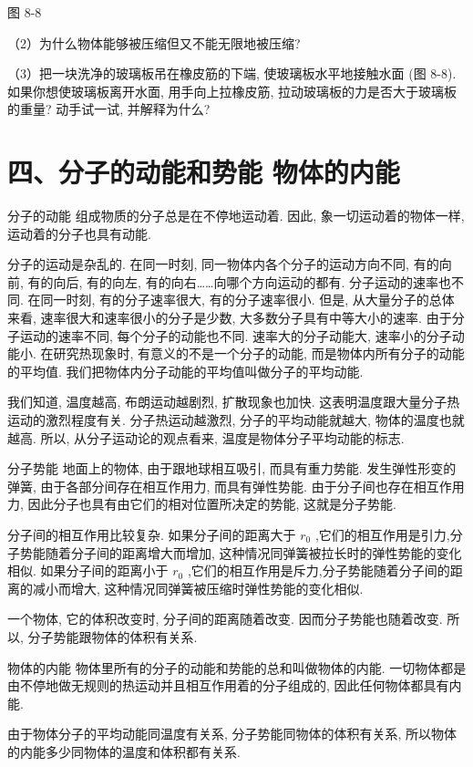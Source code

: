 \documentclass[10pt]{article}
\begin{document}
图 8-8

（2）为什么物体能够被压缩但又不能无限地被压缩?

（3）把一块洗净的玻璃板吊在橡皮筋的下端, 使玻璃板水平地接触水面 (图 8-8). 如果你想使玻璃板离开水面, 用手向上拉橡皮筋, 拉动玻璃板的力是否大于玻璃板的重量? 动手试一试, 并解释为什么?

\section*{四、分子的动能和势能 物体的内能}

分子的动能 组成物质的分子总是在不停地运动着. 因此, 象一切运动着的物体一样, 运动着的分子也具有动能.

分子的运动是杂乱的. 在同一时刻, 同一物体内各个分子的运动方向不同, 有的向前, 有的向后, 有的向左, 有的向右……向哪个方向运动的都有. 分子运动的速率也不同. 在同一时刻, 有的分子速率很大, 有的分子速率很小. 但是, 从大量分子的总体来看, 速率很大和速率很小的分子是少数, 大多数分子具有中等大小的速率. 由于分子运动的速率不同, 每个分子的动能也不同. 速率大的分子动能大, 速率小的分子动能小. 在研究热现象时, 有意义的不是一个分子的动能, 而是物体内所有分子的动能的平均值. 我们把物体内分子动能的平均值叫做分子的平均动能.

我们知道, 温度越高, 布朗运动越剧烈, 扩散现象也加快. 这表明温度跟大量分子热运动的激烈程度有关. 分子热运动越激烈, 分子的平均动能就越大, 物体的温度也就越高. 所以, 从分子运动论的观点看来, 温度是物体分子平均动能的标志.

分子势能 地面上的物体, 由于跟地球相互吸引, 而具有重力势能. 发生弹性形变的弹簧, 由于各部分间存在相互作用力, 而具有弹性势能. 由于分子间也存在相互作用力, 因此分子也具有由它们的相对位置所决定的势能, 这就是分子势能.

分子间的相互作用比较复杂. 如果分子间的距离大于 \({r}_{0}\) ,它们的相互作用是引力,分子势能随着分子间的距离增大而增加, 这种情况同弹簧被拉长时的弹性势能的变化相似. 如果分子间的距离小于 \({r}_{0}\) ,它们的相互作用是斥力,分子势能随着分子间的距离的减小而增大, 这种情况同弹簧被压缩时弹性势能的变化相似.

一个物体, 它的体积改变时, 分子间的距离随着改变. 因而分子势能也随着改变. 所以, 分子势能跟物体的体积有关系.

物体的内能 物体里所有的分子的动能和势能的总和叫做物体的内能. 一切物体都是由不停地做无规则的热运动并且相互作用着的分子组成的, 因此任何物体都具有内能.

由于物体分子的平均动能同温度有关系, 分子势能同物体的体积有关系, 所以物体的内能多少同物体的温度和体积都有关系.
\end{document}
